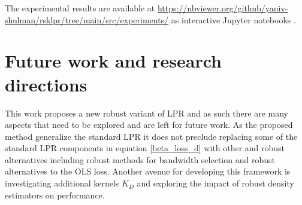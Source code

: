 \documentclass[preprint,1p,times]{elsarticle}
\begin{document}
The experimental results are available at \url{https://nbviewer.org/github/yaniv-shulman/rsklpr/tree/main/src/experiments/} as interactive Jupyter notebooks \cite{jupyter}. 

\section{Future work and research directions}
\label{S:Future work and research directions}
This work proposes a new robust variant of LPR and as such there are many aspects that need to be explored and are left for future work. As the proposed method generalize the standard LPR it does not preclude replacing some of the standard LPR components in equation \eqref{beta_loss_d} with other and robust alternatives including robust methods for bandwidth selection and robust alternatives to the OLS loss. Another avenue for developing this framework is investigating additional kernels $K_D$ and exploring the impact of robust density estimators on performance.




\end{document}
